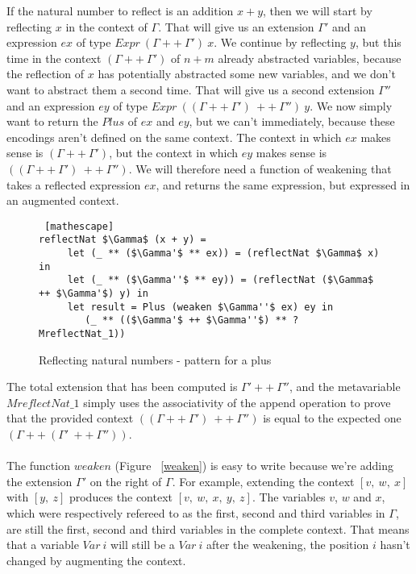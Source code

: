 If the natural number to reflect is an addition $x+y$, then we will start by reflecting $x$ in the context of $\Gamma$. That will give us an extension $\Gamma'$ and an expression $ex$ of type $Expr\ (\Gamma ++\ \Gamma')\ x$. We continue by reflecting $y$, but this time in the context $(\Gamma ++\ \Gamma')$ of $n+m$ already abstracted variables, because the reflection of $x$ has potentially abstracted some new variables, and we don't want to abstract them a second time. That will give us a second extension $\Gamma''$ and an expression $ey$ of type $Expr\ ((\Gamma ++\ \Gamma')\ ++\ \Gamma'')\ y$. We now simply want to return the $Plus$ of $ex$ and $ey$, but we can't immediately, because these encodings aren't defined on the same context. The context in which $ex$ makes sense is $(\Gamma ++\ \Gamma')$, but the context in which $ey$ makes sense is $((\Gamma ++\ \Gamma')\ ++\ \Gamma'')$. We will therefore need a function of weakening that takes a reflected expression $ex$, and returns the same expression, but expressed in an augmented context.

 \begin{figure}[H]
\figrule
\begin{center}
\begin{lstlisting} [mathescape]
reflectNat $\Gamma$ (x + y) =
     let (_ ** ($\Gamma'$ ** ex)) = (reflectNat $\Gamma$ x) in
     let (_ ** ($\Gamma''$ ** ey)) = (reflectNat ($\Gamma$ ++ $\Gamma'$) y) in
     let result = Plus (weaken $\Gamma''$ ex) ey in 
        (_ ** (($\Gamma'$ ++ $\Gamma''$) ** ?MreflectNat_1))
\end{lstlisting}
\end{center}
\caption{Reflecting natural numbers - pattern for a plus}
\label{reflectNat_pattern2}
\figrule
\end{figure}

The total extension that has been computed is $\Gamma' ++\ \Gamma''$, and the metavariable $MreflectNat\_1$ simply uses the associativity of the append operation to prove that the provided context $((\Gamma ++\ \Gamma')\ ++\ \Gamma'')$ is equal to the expected one $(\Gamma ++\ (\Gamma'\ ++\ \Gamma''))$. \\
\\
The function $weaken$ (Figure ~\ref{weaken}) is easy to write because we're adding the extension $\Gamma'$ on the right of $\Gamma$. For example, extending the context $[v,\ w,\ x]$ with $[y,\ z]$ produces the context $[v,\ w,\ x,\ y,\ z]$. The variables $v$, $w$ and $x$, which were respectively refereed to as the first, second and third variables in $\Gamma$, are still the first, second and third variables in the complete context. That means that a variable $Var\ i$ will still be a $Var\ i$ after the weakening, the position $i$ hasn't changed by augmenting the context.

